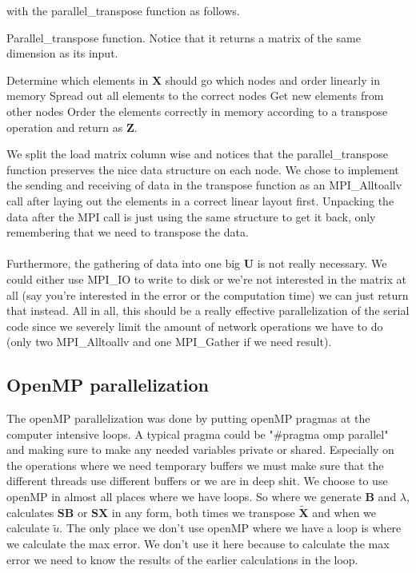 \noindent with the parallel\_transpose function as follows.\\
\begin{algorithm}[H]
 \caption{Parallel\_transpose function. Notice that it returns a matrix of the same dimension as its input.}
 Determine which elements in $\mathbf{X}$ should go which nodes and order linearly in memory \;
 Spread out all elements to the correct nodes \;
 Get new elements from other nodes \;
 Order the elements correctly in memory according to a transpose operation and return as $\mathbf{Z}$.
 \label{code:transpose}
\end{algorithm}
\noindent We split the load matrix column wise and notices that the parallel\_transpose function preserves the nice data structure on each node. We chose to implement the sending and receiving of data in the transpose function as an MPI\_Alltoallv call after laying out the elements in a correct linear layout first. Unpacking the data after the MPI call is just using the same structure to get it back, only remembering that we need to transpose the data.
\\ \\
Furthermore, the gathering of data into one big $\mathbf{U}$ is not really necessary. We could either use MPI\_IO to write to disk or we're not interested in the matrix at all (say you're interested in the error or the computation time) we can just return that instead. All in all, this should be a really effective parallelization of the serial code since we severely limit the amount of network operations we have to do (only two MPI\_Alltoallv and one MPI\_Gather if we need result).
\subsection*{OpenMP parallelization}
The openMP parallelization was done by putting openMP pragmas at the computer intensive loops. A typical pragma could be "\#pragma omp parallel" and making sure to make any needed variables private or shared. Especially on the operations where we need temporary buffers we must make sure that the different threads use different buffers or we are in deep shit. We choose to use openMP in almost all places where we have loops. So where we generate $\mathbf{B}$ and $\lambda$, calculates $\mathbf{SB}$ or $\mathbf{SX}$ in any form, both times we transpose $\mathbf{\widetilde{X}}$ and when we calculate $\widetilde{u}$. The only place we don't use openMP where we have a loop is where we calculate the max error. We don't use it here because  to calculate the max error we need to know the results of the earlier calculations in the loop.